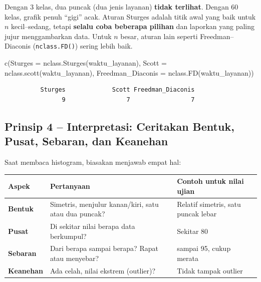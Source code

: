 \documentclass[
  indonesian,
  letterpaper,
]{book}
\newenvironment{Shaded}{\begin{snugshade}}{\end{snugshade}}
\newcommand{\AttributeTok}[1]{\textcolor[rgb]{0.40,0.45,0.13}{#1}}
\newcommand{\FunctionTok}[1]{\textcolor[rgb]{0.28,0.35,0.67}{#1}}
\newcommand{\NormalTok}[1]{\textcolor[rgb]{0.00,0.23,0.31}{#1}}
\newcounter{none} %
\begin{document}
Dengan 3 kelas, dua puncak (dua jenis layanan) \textbf{tidak terlihat}.
Dengan 60 kelas, grafik penuh ``gigi'' acak. Aturan Sturges adalah titik
awal yang baik untuk \(n\) kecil--sedang, tetapi \textbf{selalu coba
beberapa pilihan} dan laporkan yang paling jujur menggambarkan data.
Untuk \(n\) besar, aturan lain seperti Freedman--Diaconis
(\texttt{nclass.FD()}) sering lebih baik.

\begin{Shaded}
\begin{Highlighting}[]
\FunctionTok{c}\NormalTok{(}\AttributeTok{Sturges =} \FunctionTok{nclass.Sturges}\NormalTok{(waktu\_layanan), }\AttributeTok{Scott =} \FunctionTok{nclass.scott}\NormalTok{(waktu\_layanan),}
\AttributeTok{Freedman\_Diaconis =} \FunctionTok{nclass.FD}\NormalTok{(waktu\_layanan))}
\end{Highlighting}
\end{Shaded}

\begin{verbatim}
          Sturges             Scott Freedman_Diaconis 
                9                 7                 7 
\end{verbatim}

\subsection{Prinsip 4 -- Interpretasi: Ceritakan Bentuk, Pusat, Sebaran,
dan
Keanehan}\label{prinsip-4-interpretasi-ceritakan-bentuk-pusat-sebaran-dan-keanehan}

Saat membaca histogram, biasakan menjawab empat hal:

{\def\LTcaptype{none} %
\begin{longtable}[]{@{}
  >{\raggedright\arraybackslash}p{}
  >{\raggedright\arraybackslash}p{}
  >{\raggedright\arraybackslash}p{}@{}}
\toprule\noalign{}
\begin{minipage}[b]{\linewidth}\raggedright
Aspek
\end{minipage} & \begin{minipage}[b]{\linewidth}\raggedright
Pertanyaan
\end{minipage} & \begin{minipage}[b]{\linewidth}\raggedright
Contoh untuk nilai ujian
\end{minipage} \\
\midrule\noalign{}
\endhead
\bottomrule\noalign{}
\endlastfoot
\textbf{Bentuk} & Simetris, menjulur kanan/kiri, satu atau dua puncak? &
Relatif simetris, satu puncak lebar \\
\textbf{Pusat} & Di sekitar nilai berapa data berkumpul? & Sekitar 80 \\
\textbf{Sebaran} & Dari berapa sampai berapa? Rapat atau menyebar? & 63
sampai 95, cukup merata \\
\textbf{Keanehan} & Ada celah, nilai ekstrem (outlier)? & Tidak tampak
outlier \\
\end{longtable}
}
\end{document}
